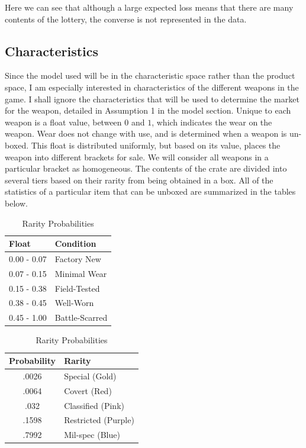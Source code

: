 \documentclass[12pt]{paper}
\begin{document}
Here we can see that although a large expected loss means that there
are many contents of the lottery, the converse is not represented in the
data. 

\subsection{Characteristics}

Since the model used will be in the characteristic space rather than
the product space, I am especially interested in characteristics of
the different weapons in the game. I shall ignore the characteristics
that will be used to determine the market for the weapon, detailed in
Assumption 1 in the model section. Unique to each weapon is a float
value, between $0$ and $1$, which indicates the wear on the
weapon. Wear does not change with use, and is determined when a weapon
is un-boxed. This float is distributed uniformly, but based on its
value, places the weapon into different brackets for sale. We will
consider all weapons in a particular bracket as homogeneous. The
contents of the crate are divided into several tiers based on their
rarity from being obtained in a box. All of the statistics of a
particular item that can be unboxed are summarized in the tables
below.


\begin{table}[!htb]
    \begin{minipage}{.5\linewidth}
      \caption{Condition Probabilities}
      \centering
        \begin{tabular}{|l|l|}\hline
          Float & Condition\\\hline
          0.00 - 0.07 & Factory New\\
          0.07 - 0.15 & Minimal Wear\\
          0.15 - 0.38 & Field-Tested\\
          0.38 - 0.45 & Well-Worn\\
          0.45 - 1.00 & Battle-Scarred\\\hline
\end{tabular}
    \end{minipage}%
    \begin{minipage}{.5\linewidth}
      \centering
        \caption{Rarity Probabilities}
        \begin{tabular}{|c|l|}\hline
          Probability & Rarity\\\hline
          .0026 & Special (Gold)\\
          .0064 & Covert (Red)\\
          .032 & Classified (Pink)\\
          .1598 & Restricted (Purple)\\
          .7992 & Mil-spec (Blue)\\\hline
\end{tabular}
    \end{minipage} 
\end{table}
\end{document}
